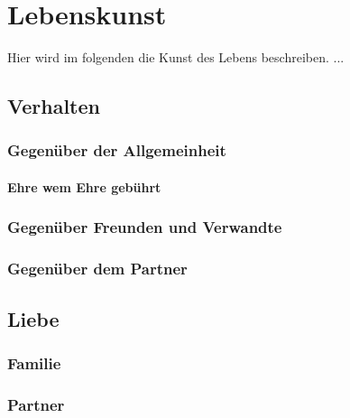\chapter{Lebenskunst} 
    \begin{thesis_quotation}
    \end{thesis_quotation}
    
    Hier wird im folgenden die Kunst des Lebens beschreiben. ...
    
    \section{Verhalten}
        \subsection{Gegenüber der Allgemeinheit}
            \subsubsection{Ehre wem Ehre gebührt}
        \subsection{Gegenüber Freunden und Verwandte}        
        \subsection{Gegenüber dem Partner}
    \section{Liebe}
        \subsection{Familie}
        \subsection{Partner}
            
    
